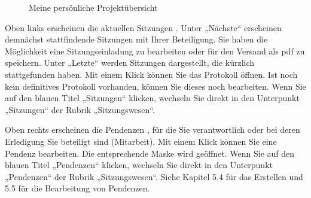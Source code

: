 \begin{figure}[H] %
\caption{Meine persönliche Projektübersicht}
\end{figure}

Oben links erscheinen die aktuellen Sitzungen . Unter „Nächste“ erscheinen demnächst stattfindende Sitzungen mit Ihrer Beteiligung. Sie haben die Möglichkeit eine Sitzungseinladung zu bearbeiten oder für den Versand als pdf zu speichern. Unter „Letzte“ werden Sitzungen dargestellt, die kürzlich stattgefunden haben. Mit einem Klick können Sie das Protokoll öffnen. Ist noch kein definitives Protokoll vorhanden, können Sie dieses noch bearbeiten. Wenn Sie auf den blauen Titel „Sitzungen“  klicken, wechseln Sie direkt in den Unterpunkt „Sitzungen“ der Rubrik „Sitzungswesen“.

\vspace{\baselineskip}

Oben rechts erscheinen die Pendenzen , für die Sie verantwortlich oder bei deren Erledigung Sie beteiligt sind (Mitarbeit). Mit einem Klick können Sie eine Pendenz bearbeiten. Die entsprechende Maske wird geöffnet. Wenn Sie auf den blauen Titel „Pendenzen“  klicken, wechseln Sie direkt in den Unterpunkt „Pendenzen“ der Rubrik „Sitzungswesen“. Siehe Kapitel 5.4 für das Erstellen und 5.5 für die Bearbeitung von Pendenzen.

\vspace{\baselineskip}

